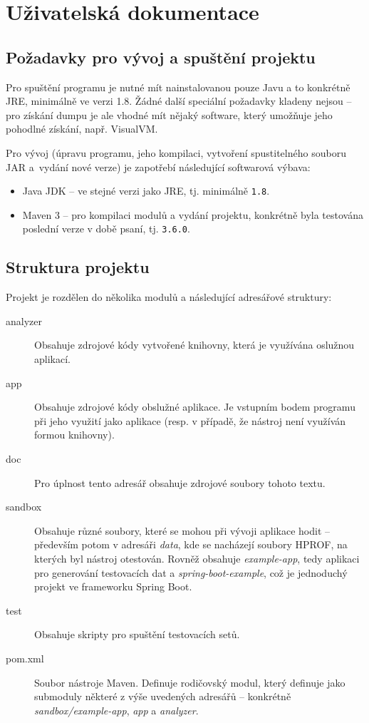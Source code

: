 \chapter{Uživatelská dokumentace}
\label{usage-doc}
\section{Požadavky pro vývoj a spuštění projektu}
Pro spuštění programu je nutné mít nainstalovanou pouze Javu a to konkrétně JRE, minimálně ve verzi 1.8. Žádné další speciální požadavky kladeny nejsou -- pro získání dumpu je ale vhodné mít nějaký software, který umožňuje jeho pohodlné získání, např. VisualVM.

Pro vývoj (úpravu programu, jeho kompilaci, vytvoření spustitelného souboru JAR a~vydání nové verze) je zapotřebí následující softwarová výbava:
\begin{itemize}
    \item Java JDK -- ve stejné verzi jako JRE, tj. minimálně \texttt{1.8}.
    \item Maven 3 -- pro kompilaci modulů a vydání projektu, konkrétně byla testována poslední verze v době psaní, tj. \texttt{3.6.0}.
\end{itemize}

\section{Struktura projektu}
Projekt je rozdělen do několika modulů a následující adresářové struktury:

\begin{description}
    \item[analyzer] Obsahuje zdrojové kódy vytvořené knihovny, která je využívána oslužnou aplikací.
    \item[app] Obsahuje zdrojové kódy obslužné aplikace. Je vstupním bodem programu při jeho využití jako aplikace (resp. v případě, že nástroj není využíván formou knihovny).
    \item[doc] Pro úplnost tento adresář obsahuje zdrojové soubory tohoto textu.
    \item[sandbox] Obsahuje různé soubory, které se mohou při vývoji aplikace hodit -- především potom v adresáři \textit{data}, kde se nacházejí soubory HPROF, na kterých byl nástroj otestován. Rovněž obsahuje \textit{example-app}, tedy aplikaci pro generování testovacích dat a \textit{spring-boot-example}, což je jednoduchý projekt ve frameworku Spring Boot.
    \item[test] Obsahuje skripty pro spuštění testovacích setů.
    \item[pom.xml] Soubor nástroje Maven. Definuje rodičovský modul, který definuje jako submoduly některé z výše uvedených adresářů -- konkrétně \textit{sandbox/example-app}, \textit{app} a \textit{analyzer}.
\end{description}


